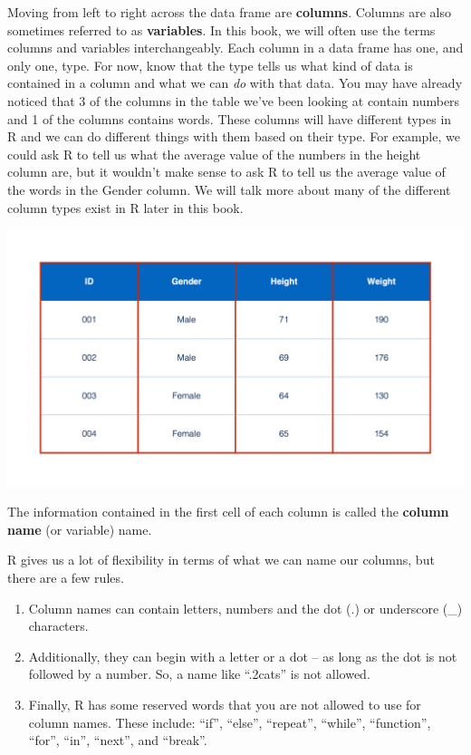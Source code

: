 \documentclass[
  letterpaper,
  DIV=11,
  numbers=noendperiod]{scrreprt}
\providecommand{\tightlist}{%
  \setlength{\itemsep}{0pt}\setlength{\parskip}{0pt}}\usepackage{longtable,booktabs,array}
\begin{document}
Moving from left to right across the data frame are \textbf{columns}.
Columns are also sometimes referred to as \textbf{variables}. In this
book, we will often use the terms columns and variables interchangeably.
Each column in a data frame has one, and only one, type. For now, know
that the type tells us what kind of data is contained in a column and
what we can \emph{do} with that data. You may have already noticed that
3 of the columns in the table we've been looking at contain numbers and
1 of the columns contains words. These columns will have different types
in R and we can do different things with them based on their type. For
example, we could ask R to tell us what the average value of the numbers
in the height column are, but it wouldn't make sense to ask R to tell us
the average value of the words in the Gender column. We will talk more
about many of the different column types exist in R later in this book.

\includegraphics{chapters/what_is_r/table_columns.png}

The information contained in the first cell of each column is called the
\textbf{column name} (or variable) name.

R gives us a lot of flexibility in terms of what we can name our
columns, but there are a few rules.

\begin{enumerate}
\def\labelenumi{\arabic{enumi}.}
\tightlist
\item
  Column names can contain letters, numbers and the dot (.) or
  underscore (\_) characters.\\
\item
  Additionally, they can begin with a letter or a dot -- as long as the
  dot is not followed by a number. So, a name like ``.2cats'' is not
  allowed.\\
\item
  Finally, R has some reserved words that you are not allowed to use for
  column names. These include: ``if'', ``else'', ``repeat'', ``while'',
  ``function'', ``for'', ``in'', ``next'', and ``break''.
\end{enumerate}
\end{document}
